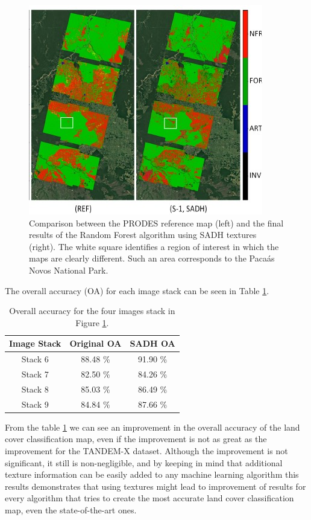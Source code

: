 \begin{figure}
    \centering
    \includegraphics{Cap3-Results/sentinel1-classificationresults.jpg}
    \caption{Comparison between the PRODES reference map (left) and the final results of the Random Forest algorithm using SADH textures (right). The white square identifies a region of interest in which the maps are clearly different.
    Such an area corresponds to the Pacaás Novos National Park.}
    \label{img:sentinel_results}
\end{figure}

The overall accuracy (OA) for each image stack can be seen in Table \ref{tab:sentinel_table_results}.

\begin{table}[H]
    \centering
    \begin{tabular}{ |c |c | c|}
     \hline
        Image Stack & Original OA & SADH OA\\ \hline \hline
        Stack 6 & 88.48 \% & 91.90 \% \\ \hline
        Stack 7 & 82.50 \% & 84.26 \% \\ \hline
        Stack 8 & 85.03 \% & 86.49 \% \\ \hline
        Stack 9 & 84.84 \% & 87.66 \% \\  \hline
    \end{tabular}
    \caption{Overall accuracy for the four images stack in Figure \ref{img:sentinel_results}.}
    \label{tab:sentinel_table_results}
\end{table}

From the table \ref{tab:sentinel_table_results} we can see an improvement in the overall accuracy of the land cover classification map, even if the improvement is not as great as the improvement for the TANDEM-X dataset. Although the improvement is not significant, it still is non-negligible, and by keeping in mind that additional texture information can be easily added to any machine learning algorithm this results demonstrates that using textures might lead to improvement of results for every algorithm that tries to create the most accurate land cover classification map, even the state-of-the-art ones.

